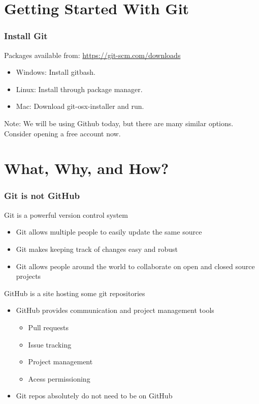 \documentclass[unknownkeysallowed]{beamer}
\begin{document}
\section{Getting Started With Git}
\begin{frame}
    \frametitle{Install Git}
    Packages available from: \url{https://git-scm.com/downloads}
    \vspace{0.5cm}
    \begin{itemize}
        \item{Windows: Install gitbash.}
        \item{Linux: Install through package manager.}
        \item{Mac: Download git-osx-installer and run. }
    \end{itemize}
    \vspace{0.5cm}
    Note: We will be using Github today, but there are many similar options. 
	Consider opening a free account now.
    
\end{frame}


\section{What, Why, and How?}
\begin{frame}
    \frametitle{Git is not GitHub}
    \vspace{0.5cm} %
    Git is a powerful version control system
            \begin{itemize}
                \item{Git allows multiple people to easily update the same source}
                \item{Git makes keeping track of changes easy and robust}
       		\item{Git allows people around the world to collaborate on open and closed source projects}
            \end{itemize}
    \vspace{0.25cm}
    GitHub is a site hosting some git repositories
            \begin{itemize}
        	\item{GitHub provides communication and project management tools}
	        \begin{itemize}
		    \item{Pull requests}
		    \item{Issue tracking}
		    \item{Project management}
		    \item{Acess permissioning}
		\end{itemize}
    \vspace{0.25cm}
	\item{Git repos absolutely do not need to be on GitHub}
    \end{itemize}
\end{frame}
\end{document}
